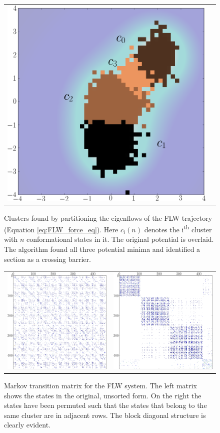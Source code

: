 \begin{figure}[tb]
  \begin{center}
    \begin{tabular}{c c}
      \includegraphics[width=.5\textwidth]{supplement/smooth_potential_cluster/pictures/cluster_locations.png}
    \end{tabular}
  \end{center}
  \caption{ Clusters found by partitioning the eigenflows of the FLW trajectory (Equation \ref{eq:FLW_force_eq}). Here $c_i(n)$ denotes the i\textsuperscript{th} cluster with $n$ conformational states in it. The original potential is overlaid. The algorithm found all three potential minima and identified a section as a crossing barrier.}
  \label{fig:clustering_smooth_map_cluster_loc}
\end{figure}
%
\begin{figure}[tb]
  \begin{center} \begin{tabular}{c c}
      \includegraphics[width=.35\textwidth]{supplement/smooth_potential_cluster/pictures/markov_matrix_unpermuted.pdf}
      &
      \includegraphics[width=.35\textwidth]{supplement/smooth_potential_cluster/pictures/markov_matrix_permuted.pdf}
  \end{tabular} \end{center}
  \caption{Markov transition matrix for the FLW system. The left matrix shows the states in the original, unsorted form. On the right the states have been permuted such that the states that belong to the same cluster are in adjacent rows. The block diagonal structure is clearly evident. }
  \label{fig:clustering_smooth_map_markov_permutes}
\end{figure}
%

